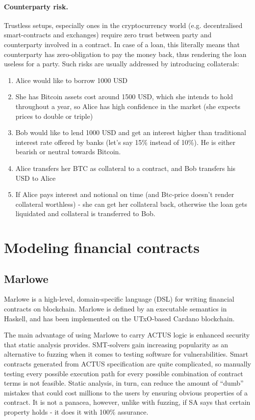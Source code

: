 \documentclass[runningheads]{llncs}
\begin{document}
\paragraph*{Counterparty risk.}

Trustless setups, especially ones in the cryptocurrency world (e.g.
decentralised smart-contracts and exchanges) require zero trust between
party and counterparty involved in a contract. In case of a loan,
this literally means that counterparty has zero-obligation to pay
the money back, thus rendering the loan useless for a party. Such
risks are usually addressed by introducing collaterals: 
\begin{enumerate}
\item Alice would like to borrow 1000 USD 
\item She has Bitcoin assets cost around 1500 USD, which she intends to
hold throughout a year, so Alice has high confidence in the market
(she expects prices to double or triple) 
\item Bob would like to lend 1000 USD and get an interest higher than traditional
interest rate offered by banks (let's say 15\% instead of 10\%). He
is either bearish or neutral towards Bitcoin. 
\item Alice transfers her BTC as collateral to a contract, and Bob transfers
his USD to Alice 
\item If Alice pays interest and notional on time (and Btc-price doesn't
render collateral worthless) - she can get her collateral back, otherwise
the loan gets liquidated and collateral is transferred to Bob. 
\end{enumerate}

\section{Modeling financial contracts}

\subsection{Marlowe }

Marlowe is a high-level, domain-specific language (DSL) for writing
financial contracts on blockchain\cite{marlowe}. Marlowe is defined
by an executable semantics in Haskell, and has been implemented on
the UTxO-based Cardano blockchain.

The main advantage of using Marlowe to carry ACTUS logic is enhanced
security that static analysis provides. SMT-solvers gain increasing
popularity as an alternative to fuzzing when it comes to testing software
for vulnerabilities\cite{smt}. Smart contracts generated from ACTUS
specification are quite complicated, so manually testing every possible
execution path for every possible combination of contract terms is
not feasible. Static analysis, in turn, can reduce the amount of ``dumb''
mistakes that could cost millions to the users by ensuring obvious
properties of a contract. It is not a panacea, however, unlike with
fuzzing, if SA says that certain property holds - it does it with
100\% assurance.
\end{document}
